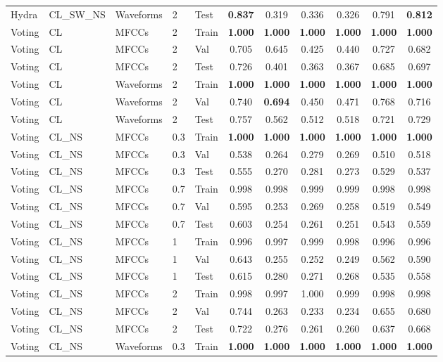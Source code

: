 \begin{landscape}
\begin{longtable}{|l|l|l|l|l|c|c|c|c|c|c|}
Hydra & CL\_SW\_NS & Waveforms & 2 & Test & \textbf{0.837} & 0.319 & 0.336 & 0.326 & 0.791 & \textbf{0.812} \\
Voting & CL & MFCCs & 2 & Train & \textbf{1.000} & \textbf{1.000} & \textbf{1.000} & \textbf{1.000} & \textbf{1.000} & \textbf{1.000} \\
Voting & CL & MFCCs & 2 & Val & 0.705 & 0.645 & 0.425 & 0.440 & 0.727 & 0.682 \\
Voting & CL & MFCCs & 2 & Test & 0.726 & 0.401 & 0.363 & 0.367 & 0.685 & 0.697 \\
Voting & CL & Waveforms & 2 & Train & \textbf{1.000} & \textbf{1.000} & \textbf{1.000} & \textbf{1.000} & \textbf{1.000} & \textbf{1.000} \\
Voting & CL & Waveforms & 2 & Val & 0.740 & \textbf{0.694} & 0.450 & 0.471 & 0.768 & 0.716 \\
Voting & CL & Waveforms & 2 & Test & 0.757 & 0.562 & 0.512 & 0.518 & 0.721 & 0.729 \\
Voting & CL\_NS & MFCCs & 0.3 & Train & \textbf{1.000} & \textbf{1.000} & \textbf{1.000} & \textbf{1.000} & \textbf{1.000} & \textbf{1.000} \\
Voting & CL\_NS & MFCCs & 0.3 & Val & 0.538 & 0.264 & 0.279 & 0.269 & 0.510 & 0.518 \\
Voting & CL\_NS & MFCCs & 0.3 & Test & 0.555 & 0.270 & 0.281 & 0.273 & 0.529 & 0.537 \\
Voting & CL\_NS & MFCCs & 0.7 & Train & 0.998 & 0.998 & 0.999 & 0.999 & 0.998 & 0.998 \\
Voting & CL\_NS & MFCCs & 0.7 & Val & 0.595 & 0.253 & 0.269 & 0.258 & 0.519 & 0.549 \\
Voting & CL\_NS & MFCCs & 0.7 & Test & 0.603 & 0.254 & 0.261 & 0.251 & 0.543 & 0.559 \\
Voting & CL\_NS & MFCCs & 1 & Train & 0.996 & 0.997 & 0.999 & 0.998 & 0.996 & 0.996 \\
Voting & CL\_NS & MFCCs & 1 & Val & 0.643 & 0.255 & 0.252 & 0.249 & 0.562 & 0.590 \\
Voting & CL\_NS & MFCCs & 1 & Test & 0.615 & 0.280 & 0.271 & 0.268 & 0.535 & 0.558 \\
Voting & CL\_NS & MFCCs & 2 & Train & 0.998 & 0.997 & 1.000 & 0.999 & 0.998 & 0.998 \\
Voting & CL\_NS & MFCCs & 2 & Val & 0.744 & 0.263 & 0.233 & 0.234 & 0.655 & 0.680 \\
Voting & CL\_NS & MFCCs & 2 & Test & 0.722 & 0.276 & 0.261 & 0.260 & 0.637 & 0.668 \\
Voting & CL\_NS & Waveforms & 0.3 & Train & \textbf{1.000} & \textbf{1.000} & \textbf{1.000} & \textbf{1.000} & \textbf{1.000} & \textbf{1.000} \\

\end{longtable}
\end{landscape}
